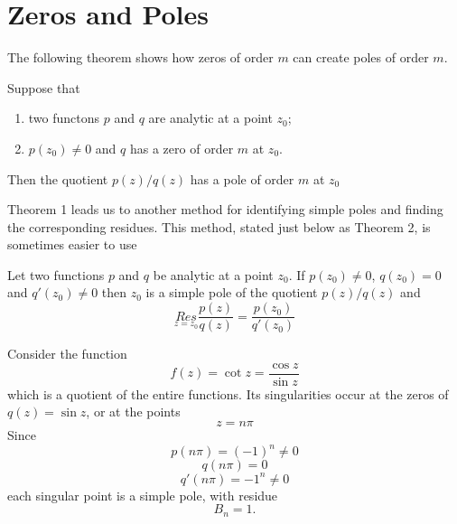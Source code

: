 \section{Zeros and Poles}
The following theorem shows how zeros of order $ m $ can create poles of order $ m $. 
\begin{theorem}
	Suppose that 
	\begin{enumerate}
		\item two functons $ p $ and $ q $ are analytic at a point $ z_0 $; 
		\item $ p(z_0) \neq 0 $ and $ q $ has a zero of order $ m $ at $ z_0 $. 
	\end{enumerate}
	Then the quotient $ p(z)/q(z) $ has a pole of order $ m $ at $ z_0 $
\end{theorem}
Theorem 1 leads us to another method for identifying simple poles and finding the corresponding residues. This method, stated just below as Theorem 2, is sometimes easier to use
\begin{theorem}
	Let two functions $ p $ and $ q $ be analytic at a point $ z_0 $. If $ p(z_0) \neq 0 $, $ q(z_0) =0 $ and $ q'(z_0) \neq 0 $ then $ z_0 $ is a simple pole of the quotient $ p(z)/q(z) $ and \[ \underset{z=z_0}{Res} \dfrac{p(z)}{q(z)} = \dfrac{p(z_0)}{q'(z_0)}\]
\end{theorem}
\begin{example}
	Consider the function \[ f(z) = \cot z = \dfrac{\cos z}{\sin z} \] which is a quotient of the entire functions. Its singularities occur at the zeros of $ q(z) = \sin z $, or at the points \[ z = n \pi \] Since \[ p(n \pi) = (-1)^n \neq 0 \]\[ q(n \pi ) = 0 \] \[ q'(n \pi) = -1^n \neq 0 \] each singular point is a simple pole, with residue \[ B_n = 1. \]
\end{example}









